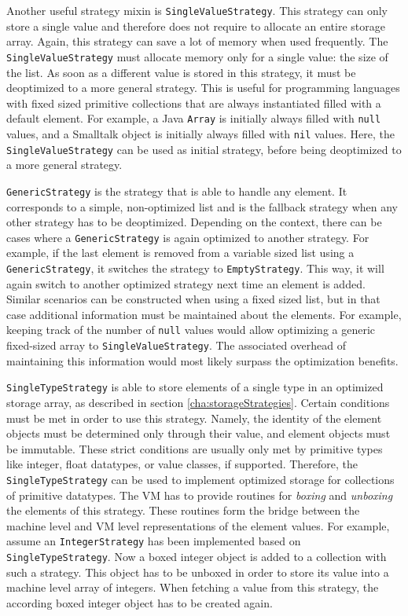 \documentclass[english,10pt]{sigplanconf}
\begin{document}
Another useful strategy mixin is \lstinline{SingleValueStrategy}.
This strategy can only store a single value and therefore does not
require to allocate an entire storage array.  Again, this strategy can
save a lot of memory when used frequently.  The
\lstinline{SingleValueStrategy} must allocate memory only for a single
value: the size of the list.  As soon as a different value is stored
in this strategy, it must be deoptimized to a more general strategy.
This is useful for programming languages with fixed sized primitive
collections that are always instantiated filled with a default
element.  For example, a Java \lstinline{Array} is initially always
filled with \lstinline{null} values, and a Smalltalk object is
initially always filled with \lstinline{nil} values.  Here, the
\lstinline{SingleValueStrategy} can be used as initial strategy,
before being deoptimized to a more general strategy.

\lstinline{GenericStrategy} is the strategy that is able to handle any
element.  It corresponds to a simple, non-optimized list and is the
fallback strategy when any other strategy has to be deoptimized.
Depending on the context, there can be cases where a
\lstinline{GenericStrategy} is again optimized to another strategy.
For example, if the last element is removed from a variable sized list
using a \lstinline{GenericStrategy}, it switches the strategy to
\lstinline{EmptyStrategy}.  This way, it will again switch to another
optimized strategy next time an element is added.  Similar scenarios
can be constructed when using a fixed sized list, but in that case
additional information must be maintained about the elements.  For
example, keeping track of the number of \lstinline{null} values would
allow optimizing a generic fixed-sized array to
\lstinline{SingleValueStrategy}.  The associated overhead of
maintaining this information would most likely surpass the
optimization benefits.

\lstinline{SingleTypeStrategy} is able to store elements of a single
type in an optimized storage array, as described in section
\ref{cha:storageStrategies}.  Certain conditions must be met in order
to use this strategy.  Namely, the identity of the element objects
must be determined only through their value, and element objects must
be immutable.  These strict conditions are usually only met by
primitive types like integer, float datatypes, or value classes, if supported.  Therefore, the
\lstinline{SingleTypeStrategy} can be used to implement optimized
storage for collections of primitive datatypes.  The VM has to
provide routines for \emph{boxing} and \emph{unboxing} the elements of
this strategy.  These routines form the bridge between the machine
level and VM level representations of the element values.  For
example, assume an \lstinline{IntegerStrategy} has been implemented
based on \lstinline{SingleTypeStrategy}.  Now a boxed integer object
is added to a collection with such a strategy.  This object has to be
unboxed in order to store its value into a machine level array of
integers.  When fetching a value from this strategy, the according
boxed integer object has to be created again.
\end{document}
